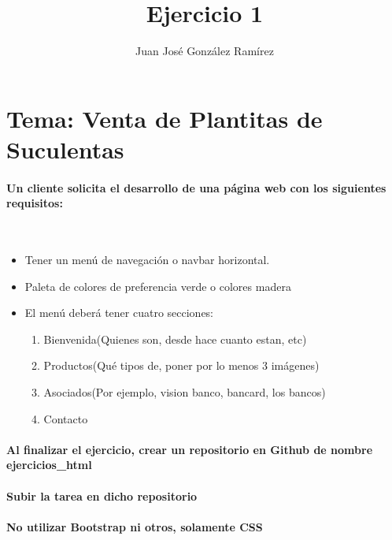 \documentclass{article}[a4paper, 11pt]
\title{Ejercicio 1}
\author{Juan José González Ramírez}
\begin{document}
\maketitle

\section{Tema: Venta de Plantitas de Suculentas}

\paragraph{Un cliente solicita el desarrollo de una página web con los siguientes requisitos:}
\
\begin{itemize}
    \item Tener un menú de navegación o navbar horizontal.
    \item Paleta de colores de preferencia verde o colores madera
    \item El menú deberá tener cuatro secciones:
    \begin{enumerate}
        \item Bienvenida(Quienes son, desde hace cuanto estan, etc)
        \item Productos(Qué tipos de, poner por lo menos 3 imágenes)
        \item Asociados(Por ejemplo, vision banco, bancard, los bancos)
        \item Contacto
    \end{enumerate}
\end{itemize}

\paragraph{Al finalizar el ejercicio, crear un repositorio en Github de nombre ejercicios\_html}
\paragraph{Subir la tarea en dicho repositorio}

\paragraph{No utilizar Bootstrap ni otros, solamente CSS}
\end{document}
